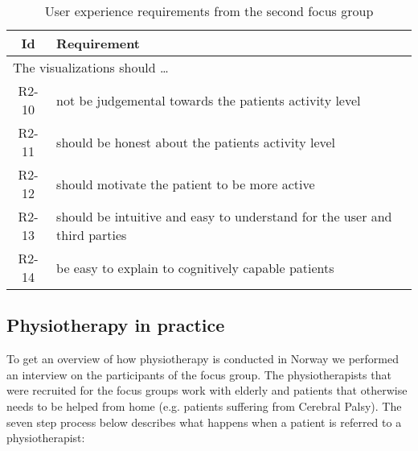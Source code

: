 \begin{table}[h!]
  \begin{center}
  \begin{tabular}{|c|p{12cm}|}
    \hline
      \textbf{Id} & \textbf{Requirement} \\ \hline
    \multicolumn{2}{|l|}{The visualizations should \ldots} \\ \hline
      R2-10 & not be judgemental towards the patients activity level \\ \hline
      R2-11 & should be honest about the patients activity level \\ \hline
      R2-12 & should motivate the patient to be more active \\ \hline
      R2-13 & should be intuitive and easy to understand for the user and third parties \\ \hline
      R2-14 & be easy to explain to cognitively capable patients \\ \hline
      
  \end{tabular}
  \end{center}
  \caption{User experience requirements from the second focus group}
\end{table}

\subsection{Physiotherapy in practice} 
\label{sec:physiotherapyPractice}
To get an overview of how physiotherapy is conducted in Norway we performed an interview on the participants of the focus group. The physiotherapists that were recruited for the focus groups work with elderly and patients that otherwise needs to be helped from home (e.g. patients suffering from Cerebral Palsy). The seven step process below describes what happens when a patient is referred to a physiotherapist:


